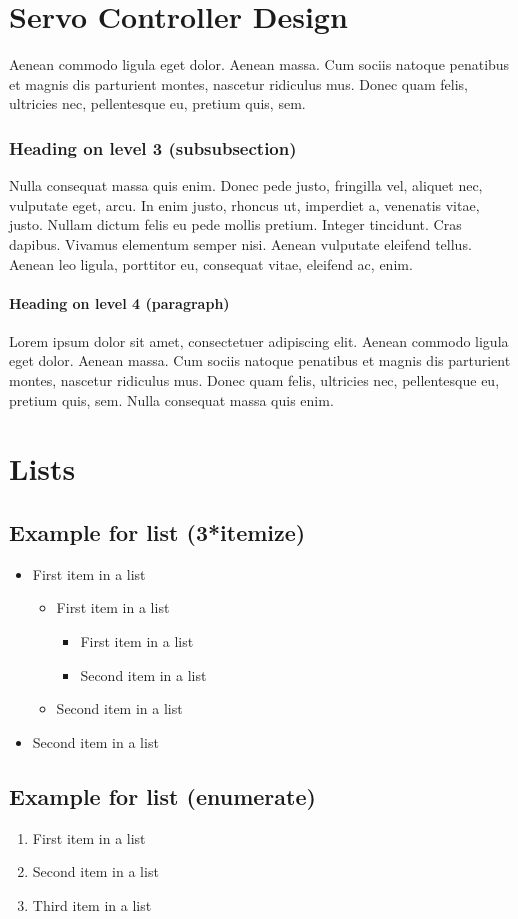 \documentclass[paper=a4, fontsize=11pt]{scrartcl}
\numberwithin{equation}{section}        %
\numberwithin{figure}{section}          %
\numberwithin{table}{section}           %
\begin{document}
\section{Servo Controller Design}
Aenean commodo ligula eget dolor. Aenean massa. Cum sociis natoque penatibus et magnis dis parturient montes, nascetur ridiculus mus. Donec quam felis, ultricies nec, pellentesque eu, pretium quis, sem.

\subsubsection{Heading on level 3 (subsubsection)}
Nulla consequat massa quis enim. Donec pede justo, fringilla vel, aliquet nec, vulputate eget, arcu. In enim justo, rhoncus ut, imperdiet a, venenatis vitae, justo. Nullam dictum felis eu pede mollis pretium. Integer tincidunt. Cras dapibus. Vivamus elementum semper nisi. Aenean vulputate eleifend tellus. Aenean leo ligula, porttitor eu, consequat vitae, eleifend ac, enim.

\paragraph{Heading on level 4 (paragraph)}
Lorem ipsum dolor sit amet, consectetuer adipiscing elit. Aenean commodo ligula eget dolor. Aenean massa. Cum sociis natoque penatibus et magnis dis parturient montes, nascetur ridiculus mus. Donec quam felis, ultricies nec, pellentesque eu, pretium quis, sem. Nulla consequat massa quis enim. 


\section{Lists}

\subsection{Example for list (3*itemize)}
\begin{itemize}
    \item First item in a list 
        \begin{itemize}
        \item First item in a list 
            \begin{itemize}
            \item First item in a list 
            \item Second item in a list 
            \end{itemize}
        \item Second item in a list 
        \end{itemize}
    \item Second item in a list 
\end{itemize}

\subsection{Example for list (enumerate)}
\begin{enumerate}
    \item First item in a list 
    \item Second item in a list 
    \item Third item in a list
\end{enumerate}
\end{document}
